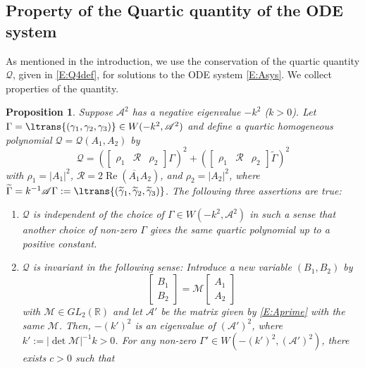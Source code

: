 \documentclass[11pt,a4paper,oneside]{amsart}
\theoremstyle{plain}
\newtheorem{proposition}[theorem]{Proposition}
\theoremstyle{remark}
\numberwithin{equation}{section}
\newcommand{\R}{\mathbb{R}}
\renewcommand{\Re}{\operatorname{Re}}
\theoremstyle{definition}
\begin{document}
\subsection{Property of the Quartic quantity of the ODE system}
\label{S:pQ}
As mentioned in the introduction, we use the conservation of the quartic quantity
$\mathcal{Q}$, given in \eqref{E:Q4def}, for solutions to the ODE system \eqref{E:Asys}.
We collect properties of the quantity.
\begin{proposition}\label{P:pQ}
Suppose $\mathscr{A}^2$ has a negative eigenvalue $-k^2$ ($k>0$). 
Let $\Gamma=\ltrans{(\gamma_1,\gamma_2,\gamma_3)} \in W(-k^2,\mathscr{A}^2)$
and define a quartic homogeneous polynomial $\mathcal{Q}=\mathcal{Q}(A_1,A_2)$ by
\[
\mathcal{Q} = (\begin{bmatrix}
	\rho_1 & \mathcal{R} & \rho_2
	\end{bmatrix}\Gamma)^2
	+(\begin{bmatrix}
	\rho_1 & \mathcal{R} & \rho_2
	\end{bmatrix} \widetilde{\Gamma})^2
\]
with $\rho_1=|A_1|^2$, $\mathcal{R}= 2\Re (\overline{A_1}A_2)$, and $\rho_2=|A_2|^2$, where
$\widetilde{\Gamma}=k^{-1} \mathscr{A}\Gamma :=\ltrans{(	\widetilde{\gamma}_1 ,
	\widetilde{\gamma}_2 ,
	\widetilde{\gamma}_3
)}$.
The following three assertions are true:
\begin{enumerate}
\item
 $\mathcal{Q}$ is independent of the choice of $\Gamma \in W(-k^2,\mathscr{A}^2)$
in such a sense that another choice of non-zero $\Gamma$ gives
the same quartic polynomial up to a positive constant.
\item $\mathcal{Q}$ is invariant in the following sense: Introduce a new variable 
$(B_1,B_2)$ by
\[
	\begin{bmatrix} B_1 \\ B_2 \end{bmatrix} = 
\mathscr{M}	\begin{bmatrix} A_1 \\ A_2 \end{bmatrix}
\]
with $\mathscr{M}\in GL_2(\R)$ and let $\mathscr{A}'$ be the matrix given by \eqref{E:Aprime} with the same $\mathscr{M}$. Then, $-(k')^2$ is an eigenvalue of $(\mathscr{A}')^2$, where $k':=|\det \mathscr{M}|^{-1} k>0$.
For any non-zero $\Gamma' \in W(-(k')^2, (\mathscr{A}')^2)$, there exists $c>0$ such that

\end{enumerate}
\end{proposition}
\end{document}
